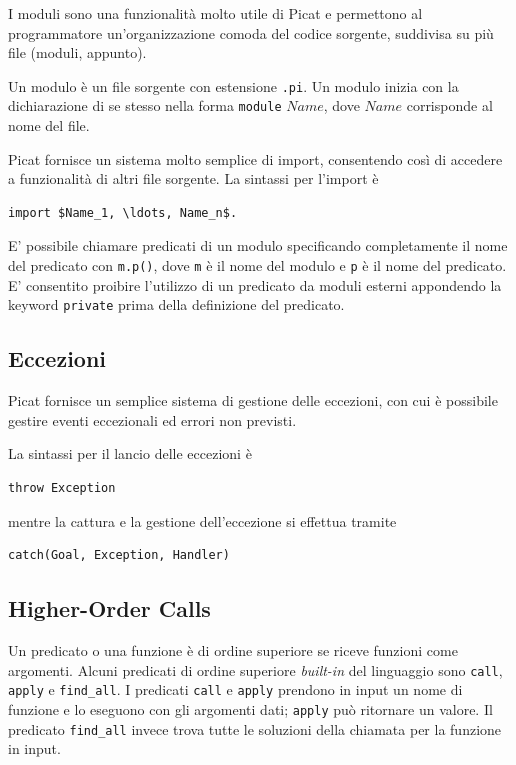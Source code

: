 \documentclass[12pt,a4paper,openright]{book} %
\begin{document}
I moduli sono una funzionalità molto utile di Picat e permettono al
programmatore un'organizzazione comoda del codice sorgente, suddivisa
su più file (moduli, appunto).

Un modulo è un file sorgente con estensione \verb|.pi|. Un modulo
inizia con la dichiarazione di se stesso nella forma \verb|module|
$Name$, dove $Name$ corrisponde al nome del file.

Picat fornisce un sistema molto semplice di import, consentendo così
di accedere a funzionalità di altri file sorgente. La sintassi per
l'import è
\begin{lstlisting}
import $Name_1, \ldots, Name_n$.
\end{lstlisting}

E' possibile chiamare predicati di un modulo specificando
completamente il nome del predicato con \verb|m.p()|, dove \verb|m| è
il nome del modulo e \verb|p| è il nome del predicato. E' consentito
proibire l'utilizzo di un predicato da moduli esterni appondendo la
keyword \verb|private| prima della definizione del predicato.

\subsection{Eccezioni}
\label{subsec:picat_advanced_exceptions}

Picat fornisce un semplice sistema di gestione delle eccezioni, con
cui è possibile gestire eventi eccezionali ed errori non previsti.

La sintassi per il lancio delle eccezioni è
\begin{lstlisting}
throw Exception
\end{lstlisting}
mentre la cattura e la gestione dell'eccezione si effettua tramite
\begin{lstlisting}
catch(Goal, Exception, Handler)
\end{lstlisting}

\subsection{Higher-Order Calls}
\label{subsec:picat_advanced_hoc}

Un predicato o una funzione è di ordine superiore se riceve funzioni
come argomenti. Alcuni predicati di ordine superiore \emph{built-in}
del linguaggio sono \verb|call|, \verb|apply| e \verb|find_all|. I
predicati \verb|call| e \verb|apply| prendono in input un nome di
funzione e lo eseguono con gli argomenti dati; \verb|apply| può
ritornare un valore. Il predicato \verb|find_all| invece trova tutte
le soluzioni della chiamata per la funzione in input.
\end{document}
